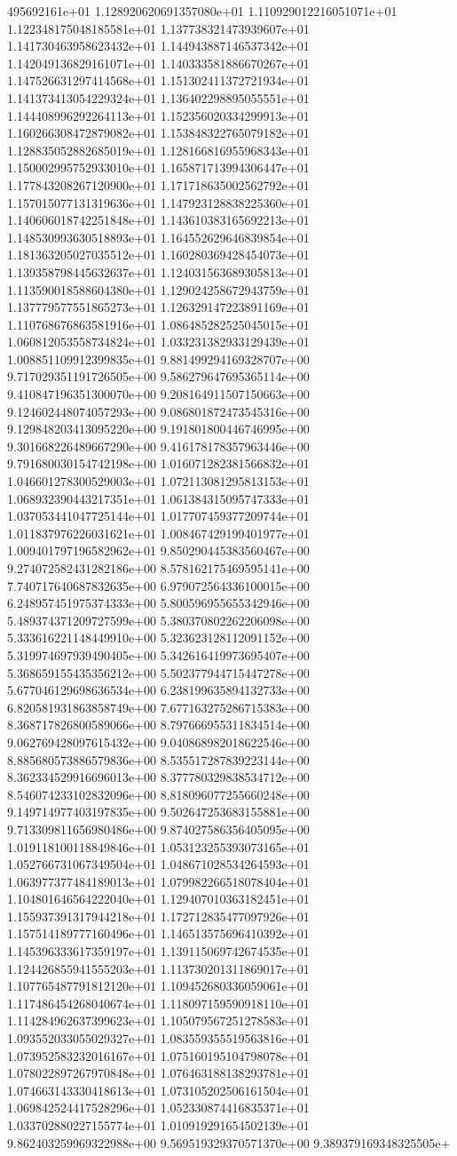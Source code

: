 495692161e+01	1.128920620691357080e+01	1.110929012216051071e+01	1.122348175048185581e+01	1.137738321473939607e+01	1.141730463958623432e+01	1.144943887146537342e+01	1.142049136829161071e+01	1.140333581886670267e+01	1.147526631297414568e+01	1.151302411372721934e+01	1.141373413054229324e+01	1.136402298895055551e+01	1.144408996292264113e+01	1.152356020334299913e+01	1.160266308472879082e+01	1.153848322765079182e+01	1.128835052882685019e+01	1.128166816955968343e+01	1.150002995752933010e+01	1.165871713994306447e+01	1.177843208267120900e+01	1.171718635002562792e+01	1.157015077131319636e+01	1.147923128838225360e+01	1.140606018742251848e+01	1.143610383165692213e+01	1.148530993630518893e+01	1.164552629646839854e+01	1.181363205027035512e+01	1.160280369428454073e+01	1.139358798445632637e+01	1.124031563689305813e+01	1.113590018588604380e+01	1.129024258672943759e+01	1.137779577551865273e+01	1.126329147223891169e+01	1.110768676863581916e+01	1.086485282525045015e+01	1.060812053558734824e+01	1.033231382933129439e+01	1.008851109912399835e+01	9.881499294169328707e+00	9.717029351191726505e+00	9.586279647695365114e+00	9.410847196351300070e+00	9.208164911507150663e+00	9.124602448074057293e+00	9.086801872473545316e+00	9.129848203413095220e+00	9.191801800446746995e+00	9.301668226489667290e+00	9.416178178357963446e+00	9.791680030154742198e+00	1.016071282381566832e+01	1.046601278300529003e+01	1.072113081295813153e+01	1.068932390443217351e+01	1.061384315095747333e+01	1.037053441047725144e+01	1.017707459377209744e+01	1.011837976226031621e+01	1.008467429199401977e+01	1.009401797196582962e+01	9.850290445383560467e+00	9.274072582431282186e+00	8.578162175469595141e+00	7.740717640687832635e+00	6.979072564336100015e+00	6.248957451975374333e+00	5.800596955655342946e+00	5.489374371209727599e+00	5.380370802262206098e+00	5.333616221148449910e+00	5.323623128112091152e+00	5.319974697939490405e+00	5.342616419973695407e+00	5.368659155435356212e+00	5.502377944715447278e+00	5.677046129698636534e+00	6.238199635894132733e+00	6.820581931863858749e+00	7.677163275286715383e+00	8.368717826800589066e+00	8.797666955311834514e+00	9.062769428097615432e+00	9.040868982018622546e+00	8.885680573886579836e+00	8.535517287839223144e+00	8.362334529916696013e+00	8.377780329838534712e+00	8.546074233102832096e+00	8.818096077255660248e+00	9.149714977403197835e+00	9.502647253683155881e+00	9.713309811656980486e+00	9.874027586356405095e+00	1.019118100118849846e+01	1.053123255393073165e+01	1.052766731067349504e+01	1.048671028534264593e+01	1.063977377484189013e+01	1.079982266518078404e+01	1.104801646564222040e+01	1.129407010363182451e+01	1.155937391317944218e+01	1.172712835477097926e+01	1.157514189777160496e+01	1.146513575696410392e+01	1.145396333617359197e+01	1.139115069742674535e+01	1.124426855941555203e+01	1.113730201311869017e+01	1.107765487791812120e+01	1.109452680336059061e+01	1.117486454268040674e+01	1.118097159590918110e+01	1.114284962637399623e+01	1.105079567251278583e+01	1.093552033055029327e+01	1.083559355519563816e+01	1.073952583232016167e+01	1.075160195104798078e+01	1.078022897267970848e+01	1.076463188138293781e+01	1.074663143330418613e+01	1.073105202506161504e+01	1.069842524417528296e+01	1.052330874416835371e+01	1.033702880227155774e+01	1.010919291654502139e+01	9.862403259969322988e+00	9.569519329370571370e+00	9.389379169348325505e+
